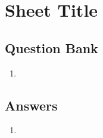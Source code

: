 \documentclass[a4paper,12pt]{article}
\begin{document}
\section*{Sheet Title}

\subsection*{Question Bank}

\begin{enumerate}
\item 
\end{enumerate}

\newpage
\subsection*{Answers}

\begin{enumerate}
\item 
\end{enumerate}
\end{document}
